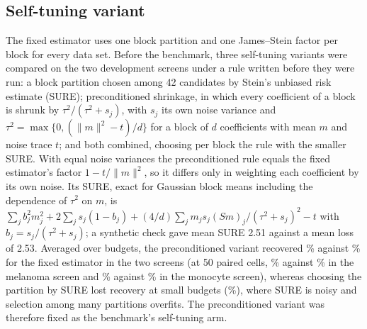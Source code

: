 \subsection*{Self-tuning variant}
The fixed estimator uses one block partition and one James--Stein factor per block for every data set. Before the benchmark, three self-tuning variants were compared on the two development screens under a rule written before they were run: a block partition chosen among 42 candidates by Stein's unbiased risk estimate (SURE); preconditioned shrinkage, in which every coefficient of a block is shrunk by $\tau^2/(\tau^2+s_j)$, with $s_j$ its own noise variance and $\tau^2=\max\{0,(\|m\|^2-t)/d\}$ for a block of $d$ coefficients with mean $m$ and noise trace $t$; and both combined, choosing per block the rule with the smaller SURE. With equal noise variances the preconditioned rule equals the fixed estimator's factor $1-t/\|m\|^2$, so it differs only in weighting each coefficient by its own noise. Its SURE, exact for Gaussian block means including the dependence of $\tau^2$ on $m$, is $\sum_jb_j^2m_j^2+2\sum_js_j(1-b_j)+(4/d)\sum_jm_js_j(Sm)_j/(\tau^2+s_j)^2-t$ with $b_j=s_j/(\tau^2+s_j)$; a synthetic check gave mean SURE 2.51 against a mean loss of 2.53. Averaged over budgets, the preconditioned variant recovered \SpSelfCriterion\% against \SpFixedCriterion\% for the fixed estimator in the two screens (at 50 paired cells, \SpSelfFrFifty\% against \SpFixedFrFifty\% in the melanoma screen and \SpSelfPaFifty\% against \SpFixedPaFifty\% in the monocyte screen), whereas choosing the partition by SURE lost recovery at small budgets (\SpSelfPartitionCriterion\%), where SURE is noisy and selection among many partitions overfits. The preconditioned variant was therefore fixed as the benchmark's self-tuning arm.

